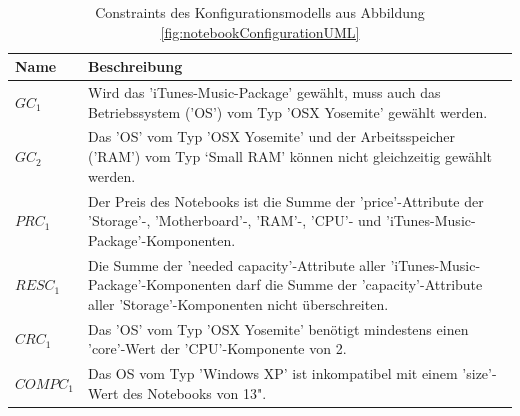 \documentclass[11pt, a4paper, titlepage, listof=totoc, bibliography=totoc, index=totoc, twoside, openright, headings=normal, draft]{scrreprt}
\begin{document}
\begin{table}[]
\centering
\caption{Constraints des Konfigurationsmodells aus Abbildung \ref{fig:notebookConfigurationUML}}
\label{tab:notebookConfigurationConstraints}
\begin{tabularx}{\textwidth}{|l|X|}
\hline
{\bf Name} & {\bf Beschreibung}\\
\hline
$GC_1$ & Wird das 'iTunes-Music-Package' gewählt, muss auch das Betriebssystem ('OS') vom Typ 'OSX Yosemite' gewählt werden. \\
\hline
$GC_2$ & Das 'OS' vom Typ 'OSX Yosemite' und der Arbeitsspeicher ('RAM') vom Typ ‘Small RAM' können nicht gleichzeitig gewählt werden.\\
\hline
$PRC_1$ & Der Preis des Notebooks ist die Summe der 'price'-Attribute der 'Storage'-, 'Motherboard'-, 'RAM'-, 'CPU'- und 'iTunes-Music-Package'-Komponenten.\\
\hline
$RESC_1$ & Die Summe der 'needed capacity'-Attribute aller 'iTunes-Music-Package'-Komponenten darf die Summe der 'capacity'-Attribute aller 'Storage'-Komponenten nicht überschreiten.\\
\hline
$CRC_1$ & Das 'OS' vom Typ 'OSX Yosemite' benötigt mindestens einen 'core'-Wert der 'CPU'-Komponente von 2.\\
\hline
$COMPC_1$ & Das OS vom Typ 'Windows XP' ist inkompatibel mit einem 'size'-Wert des Notebooks von 13".\\
\hline
\end{tabularx}
\end{table}
\end{document}
